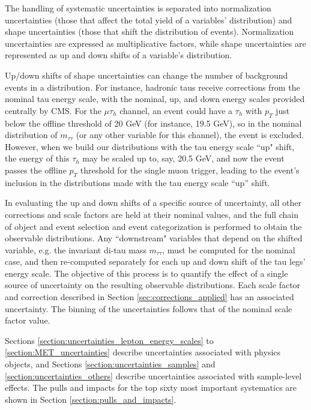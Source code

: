 The handling of systematic uncertainties is separated into normalization uncertainties (those that affect the total yield of a variables' distribution) and shape uncertainties (those that shift the distribution of events). Normalization uncertainties are expressed as multiplicative factors, while shape uncertainties are represented as up and down shifts of a variable's distribution.

Up/down shifts of shape uncertainties can change the number of background events in a distribution. For instance, hadronic taus receive corrections from the nominal tau energy scale, with the nominal, up, and down energy scales provided centrally by CMS. For the $\mu\tau_{h}$ channel, an event could have a $\tau_{h}$ with $p_{T}$ just below the offline threshold of 20 GeV (for instance, 19.5 GeV), so in the nominal distribution of $m_{\tau\tau}$ (or any other variable for this channel), the event is excluded. However, when we build our distributions with the tau energy scale ``up" shift, the energy of this $\tau_{h}$ may be scaled up to, say, 20.5 GeV, and now the event passes the offline $p_{T}$ threshold for the single muon trigger, leading to the event's inclusion in the distributions made with the tau energy scale ``up'' shift.

In evaluating the up and down shifts of a specific source of uncertainty, all other corrections and scale factors are held at their nominal values, and the full chain of object and event selection and event categorization is performed to obtain the observable distributions. Any ``downstream" variables that depend on the shifted variable, e.g. the invariant di-tau mass $m_{\tau\tau}$, must be computed for the nominal case, and then re-computed separately for each up and down shift of the tau legs' energy scale.  The objective of this process is to quantify the effect of a single source of uncertainty on the resulting observable distributions. Each scale factor and correction described in Section \ref{sec:corrections_applied} has an associated uncertainty. The binning of the uncertainties follows that of the nominal scale factor value.

Sections \ref{section:uncertainties_lepton_energy_scales} to \ref{section:MET_uncertainties} describe uncertainties associated with physics objects, and Sections \ref{section:uncertainties_samples} and \ref{section:uncertainties_others} describe uncertainties associated with sample-level effects. The pulls and impacts for the top sixty most important systematics are shown in Section \ref{section:pulls_and_impacts}.



